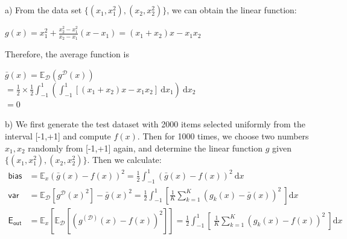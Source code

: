 \documentclass[12pt]{article}
\begin{document}
 \\\\
\indent a) From the data set $\{ (x_1,x_1^2),(x_2,x_2^2) \}$, we can obtain the linear function: \begin{center}$\displaystyle g(x) = x_1^2 + \frac{x_2^2-x_1^2}{x_2-x_1}(x-x_1) = (x_1+x_2)x - x_1x_2$ \end{center} Therefore, the average function is \begin{center} $\displaystyle \bar{g}(x) = \mathbb{E}_{\mathcal{D}}(g^{\mathcal{D}}(x))$\\$= \frac{1}{2}\times\frac{1}{2}\int_{-1}^{1}\left(\int_{-1}^{1}\left[(x_1+x_2)x-x_1x_2\right]\ \mathrm{d}x_1\right)\ \mathrm{d}x_2$\\$=0$\end{center}
\indent \indent b) We first generate the test dataset with 2000 items selected uniformly from the interval [-1,+1] and compute $f(x)$. Then for 1000 times, we choose two numbers $x_1,x_2$ randomly from [-1,+1] again, and determine the linear function $g$ given $\{ (x_1,x_1^2),(x_2,x_2^2) \}$.  Then we calculate: \begin{align*}\displaystyle
			\mathsf{bias} &= \mathbb{E}_x( \bar{g}(x)-f(x) )^2 = \frac{1}{2}\int_{-1}^{1}( \bar{g}(x)-f(x) )^2\ \mathrm{d}x \\
			\mathsf{var} &= \mathbb{E}_{\mathcal{D}}[ g^{\mathcal{D}}(x)^2] - \bar{g}(x)^2= \frac{1}{2}\int_{-1}^{1}\left[ \frac{1}{K}\sum_{k = 1}^K (g_k(x)-\bar{g}(x))^2\ \right]\mathrm{d}x \\
			\mathsf{E_{out}} 
			& = \mathbb{E}_{x}\left[\mathbb{E}_{\mathcal{D}}[(g^{(\mathcal{D})}(x)-f(x))^2]\right] = \frac{1}{2}\int_{-1}^{1} \left[\ \frac{1}{K}\sum_{k = 1}^K (g_k(x)-f(x))^2\ \right] \mathrm{d}x
		\end{align*}
\end{document}
